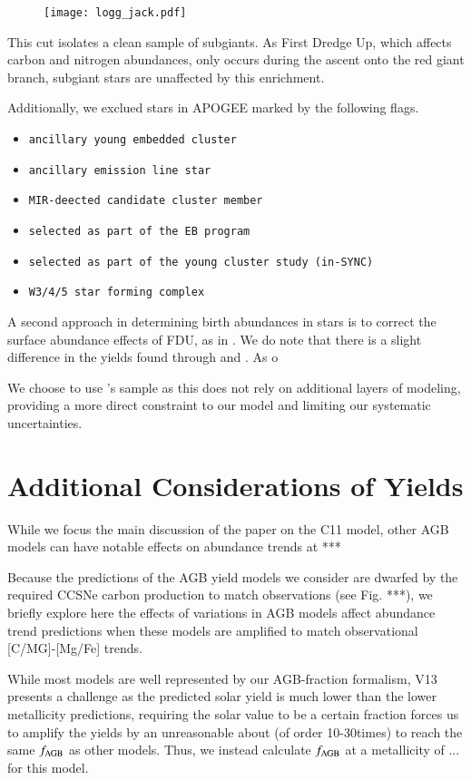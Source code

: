 \documentclass[12pt,oneside]{report}
\begin{document}
\begin{figure}
    \centering
    \texttt{[image: logg\_jack.pdf]}
\end{figure}

This cut isolates a clean sample of subgiants. As First Dredge Up, which affects carbon and nitrogen abundances, only occurs during the ascent onto the red giant branch, subgiant stars are unaffected by this enrichment. 

Additionally, we exclued stars in APOGEE marked by the following flags.
\begin{itemize}
\item \texttt{ancillary young embedded cluster}
\item \texttt{ancillary emission line star}
\item \texttt{MIR-deected candidate cluster member}
\item \texttt{selected as part of the EB program}
\item \texttt{selected as part of the young cluster study (in-SYNC)}
\item \texttt{W3/4/5 star forming complex}
\end{itemize}

A second approach in determining birth abundances in stars is to correct the surface abundance effects of FDU, as in \cite{fiorenzo+21}. We do note that there is a slight difference in the yields found through \cite{fiorenzo+21} and \cite{jack_subgiant}. As o

We choose to use \cite{jack_subgiant}'s sample as this does not rely on additional layers of modeling, providing a more direct constraint to our model and limiting our systematic uncertainties.

\newpage
\section{Additional Considerations of Yields}\label{sec:alt_agb}


While we focus the main discussion of the paper on the C11 model, other AGB models can have notable effects on abundance trends at ***

Because the predictions of the AGB yield models we consider are dwarfed by the
required CCSNe carbon production to match observations (see Fig. ***), we briefly explore here the effects of variations in AGB models affect abundance trend predictions when these models are amplified to match observational [C/MG]-[Mg/Fe] trends. 

While most models are well represented by our AGB-fraction formalism, V13 presents a challenge as the predicted solar yield is much lower than the lower metallicity predictions, requiring the solar value to be a certain fraction forces us to amplify the yields by an unreasonable about (of order 10-30times) to reach the same $f_{\rm AGB}$ as other models. Thus, we instead calculate $f_{\rm AGB}$ at a metallicity of ... for this model. 
\end{document}
